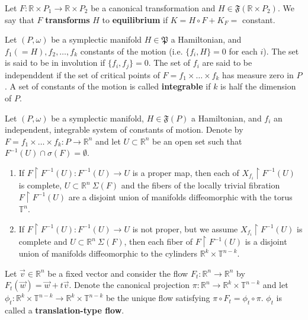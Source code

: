 \begin{defn}
    Let $F: \mathbb{R} \times P_1 \to \mathbb{R} \times P_2$ be a canonical transformation and $H \in \mathfrak{F}(\mathbb{R} \times P_2)$. We say that $F$ \textbf{transforms} $H$ to \textbf{equilibrium} if $K = H \circ F + K_F =$ constant.
\end{defn}


\begin{defn}
    Let $(P,\omega)$ be a symplectic manifold $H \in \mathfrak{P}$ a Hamiltonian, and $f_1 (=H), f_2, \ldots, f_k$ constants of the motion (i.e. $\{f_i,H\}=0$ for each $i$). The set is said to be in involution if $\{f_i,f_j\} = 0$. The set of $f_i$ are said to be independdent if the set of critical points of $F = f_1 \times \ldots \times f_k$ has measure zero in $P$. A set of constants of the motion is called \textbf{integrable} if $k$ is half the dimension of $P$.
\end{defn}



\begin{thm}
    Let $(P,\omega)$ be a symplectic manifold, $H \in \mathfrak{F}(P)$ a Hamiltonian, and $f_i$ an independent, integrable system of constants of motion. Denote by $F = f_1 \times \ldots \times f_k: P \to \mathbb{R}^n$ and let $U \subset \mathbb{R}^n$ be an open set such that $F^{-1}(U) \cap \sigma(F) = \emptyset$.
    \begin{enumerate}
        \item If $F \restriction F^{-1}(U): F^{-1}(U) \to U$ is a proper map, then each of $X_{f_i} \restriction F^{-1}(U)$ is complete, $U \subset \mathbb{R}^n \ \Sigma(F)$ and the fibers of the locally trivial fibration $F \restriction F^{-1}(U)$ are a disjoint union of manifolds diffeomorphic with the torus $\mathbb{T}^n$.
        \item If $F \restriction F^{-1}(U): F^{-1}(U) \to U$ is not proper, but we assume $X_{f_i} \restriction F^{-1}(U)$ is complete and $U \subset \mathbb{R}^n \ \Sigma(F)$, then each fiber of $F \restriction F^{-1}(U)$ is a disjoint union of manifolds diffeomorphic to the cylinders $\mathbb{R}^k \times \mathbb{T}^{n-k}$.
    \end{enumerate}

\end{thm}

\begin{defn}

    Let $\vec{v} \in \mathbb{R}^n$ be a fixed vector and consider the flow $F_t: \mathbb{R}^n \to \mathbb{R}^n$ by $F_t(\vec{w}) = \vec{w} + t \vec{v}$. Denote the canonical projection $\pi: \mathbb{R}^n \to \mathbb{R}^k \times \mathbb{T}^{n-k}$ and let $\phi_t: \mathbb{R}^k \times \mathbb{T}^{n-k} \to \mathbb{R}^k \times \mathbb{T}^{n-k}$ be the unique flow satisfying $\pi \circ F_t = \phi_t \circ \pi$. $\phi_t$ is called a \textbf{translation-type flow}.
\end{defn}

